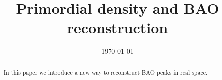 \documentclass[aps,prd,twocolumn,showpacs,superscriptaddress,groupedaddress,nofootinbib]{revtex4}  %
\begin{document}
\widetext

\title{Primordial density and BAO reconstruction}

%
%
%

\date{\today}

\begin{abstract}
In this paper we introduce a new way to reconstruct BAO peaks in real space.





\end{abstract}

\pacs{}
\maketitle

\end{document}
